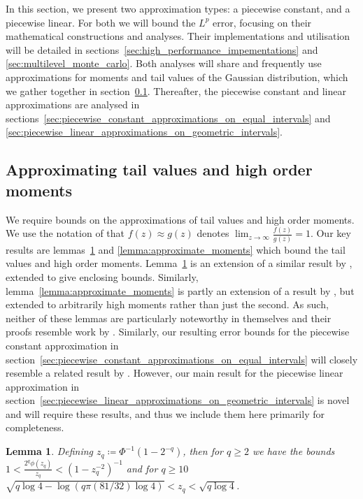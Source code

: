 \documentclass[9pt,a4paper,english]{extarticle}
\newtheorem{lemma}[theorem]{Lemma}
\begin{document}
In this section, we present two approximation types: a piecewise constant, and a piecewise linear. For both we will bound the $ L^p $ error, focusing on their mathematical constructions and analyses. Their implementations and utilisation will be detailed in sections~\ref{sec:high_performance_impementations} and \ref{sec:multilevel_monte_carlo}. Both analyses will share and frequently use approximations for moments and tail values of the Gaussian distribution, which we gather together in section~\ref{sec:approximating_tail_values_and_high_order_moments}. Thereafter, the piecewise constant and linear approximations are analysed in sections~\ref{sec:piecewise_constant_approximations_on_equal_intervals} and \ref{sec:piecewise_linear_approximations_on_geometric_intervals}.

\subsection{Approximating tail values and high order moments}
\label{sec:approximating_tail_values_and_high_order_moments}

We require bounds on the approximations of tail values and high order moments. We use the notation of \citet{giles2019random_quadrature} that $ f(z) \approx g(z) $ denotes $ \lim_{z\to\infty} \tfrac{f(z)}{g(z)} = 1 $. Our key results are lemmas~\ref{lemma:approximate_tail_values} and \ref{lemma:approximate_moments} which bound the tail values and high order moments. Lemma~\ref{lemma:approximate_tail_values} is an extension of a similar result by \citet[lemma~7]{giles2019random_quadrature}, extended to give enclosing bounds. Similarly, lemma~\ref{lemma:approximate_moments} is partly an extension of a result by \citet[lemma~9]{giles2019random_quadrature}, but extended to arbitrarily high moments rather than just the second. As such, neither of these lemmas are particularly noteworthy in themselves and their proofs resemble work by \citet[appendix~A]{giles2019random_quadrature}. Similarly, our resulting error bounds for the piecewise constant approximation in section~\ref{sec:piecewise_constant_approximations_on_equal_intervals} will closely resemble a related result by \citet[theorem~1]{giles2019random_quadrature}. However, our main result for the piecewise linear approximation in section~\ref{sec:piecewise_linear_approximations_on_geometric_intervals} is novel and will require these results, and thus we include them here primarily for completeness. 

\begin{lemma}
\label{lemma:approximate_tail_values}
Defining $ z_q \coloneqq \Phi^{-1}(1 {-} 2^{-q})$, then for $ q \geq  2 $ we have the bounds $ 1 < \tfrac{2^q\phi(z_q)}{z_q} < (1 - z_q^{-2})^{-1}$  and for  $ q \geq 10 $
$ \sqrt{q \log 4 - \log(q \pi (81/32) \log 4)} < z_q  < \sqrt{q \log 4}$.
\end{lemma}
\end{document}
